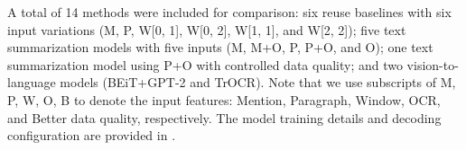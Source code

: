 
A total of 14 methods were included for comparison: 
six reuse baselines with six input variations
(M, P, W[0, 1], W[0, 2], W[1, 1], and W[2, 2]);
five text summarization models with five inputs
(M, M+O, P, P+O, and O);
one text summarization model using P+O with controlled data quality; 
and two vision-to-language models (BEiT+GPT-2 and TrOCR). 
Note that we use subscripts of M, P, W, O, B to denote the input features: 
Mention, Paragraph, Window, OCR, and Better data quality, respectively.
The model training details and decoding configuration are provided in .





